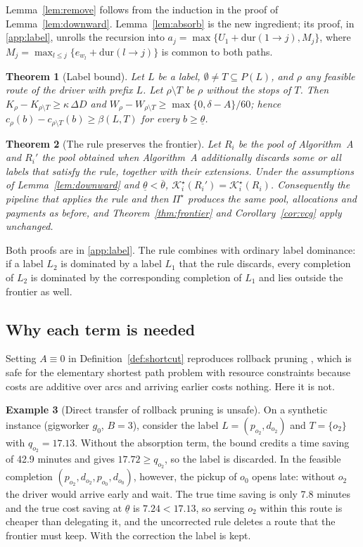 \documentclass[review,12pt]{elsarticle}
\newtheorem{theorem}{Theorem}
\theoremstyle{definition}
\newtheorem{example}[theorem]{Example}
\theoremstyle{remark}
\newcommand{\Kstar}{\mathcal{K}^\star}
\newcommand{\lth}{\underline{\theta}}
\newcommand{\uth}{\overline{\theta}}
\begin{document}
Lemma~\ref{lem:remove} follows from the induction in the proof of
Lemma~\ref{lem:downward}. Lemma~\ref{lem:absorb} is the new ingredient; its
proof, in \ref{app:label}, unrolls the recursion into
$a_j=\max\{U_1+\mathrm{dur}(1\to j),M_j\}$, where
$M_j=\max_{l\le j}\{e_{w_l}+\mathrm{dur}(l\to j)\}$ is common to both
paths.

\begin{theorem}[Label bound]
\label{thm:labelbound}
Let $L$ be a label, $\emptyset\ne T\subseteq P(L)$, and $\rho$ any feasible
route of the driver with prefix $L$. Let $\rho\setminus T$ be $\rho$
without the stops of $T$. Then $K_\rho-K_{\rho\setminus T}\ge\kappa\,\Delta D$
and $W_\rho-W_{\rho\setminus T}\ge\max\{0,\delta-A\}/60$; hence
$c_\rho(b)-c_{\rho\setminus T}(b)\ge\beta(L,T)$ for every $b\ge\lth$.
\end{theorem}

\begin{theorem}[The rule preserves the frontier]
\label{thm:preserve}
Let $R_i$ be the pool of Algorithm~A and $R_i'$ the pool obtained when
Algorithm~A additionally discards some or all labels that satisfy the rule,
together with their extensions. Under the assumptions of
Lemma~\ref{lem:downward} and $\lth<\uth$,
$\Kstar_i(R_i')=\Kstar_i(R_i)$. Consequently the pipeline that applies the
rule and then $\Pi^\star$ produces the same pool, allocations and payments
as before, and Theorem~\ref{thm:frontier} and Corollary~\ref{cor:vcg} apply
unchanged.
\end{theorem}

Both proofs are in \ref{app:label}. The rule combines with ordinary label
dominance: if a label $L_2$ is dominated by a label $L_1$ that the rule
discards, every completion of $L_2$ is dominated by the corresponding
completion of $L_1$ and lies outside the frontier as well.

\subsection{Why each term is needed}

Setting $A\equiv 0$ in Definition~\ref{def:shortcut} reproduces rollback
pruning \citep{lozano2016exact}, which is safe for the elementary shortest
path problem with resource constraints because costs are additive over arcs
and arriving earlier costs nothing. Here it is not.

\begin{example}[Direct transfer of rollback pruning is unsafe]
\label{ex:rollback}
On a synthetic instance (gigworker $g_0$, $B=3$), consider the label
$L=(p_{o_2},d_{o_2})$ and $T=\{o_2\}$ with $q_{o_2}=17.13$. Without the
absorption term, the bound credits a time saving of 42.9 minutes and gives
$17.72\ge q_{o_2}$, so the label is discarded. In the feasible completion
$(p_{o_2},d_{o_2},p_{o_0},d_{o_0})$, however, the pickup of $o_0$ opens late:
without $o_2$ the driver would arrive early and wait. The true time saving
is only 7.8 minutes and the true cost saving at $\lth$ is
$7.24<17.13$, so serving $o_2$ within this route is cheaper than delegating
it, and the uncorrected rule deletes a route that the frontier must keep.
With the correction the label is kept.
\end{example}
\end{document}
